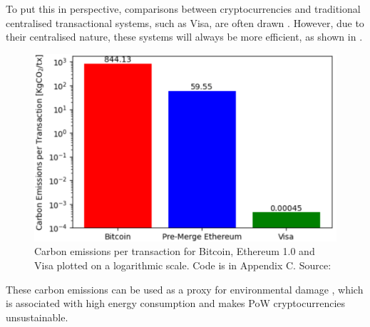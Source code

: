 To put this in perspective, comparisons between cryptocurrencies and traditional centralised transactional systems, such as Visa, are often drawn \cite{Kohli2023AnSolutions}. However, due to their centralised nature, these systems will always be more efficient, as shown in .

\begin{figure}[!htb]
    \centering
    \includegraphics[width=13cm,center]{Figures/CarbonEmissionsPlot.png}
    \caption{Carbon emissions per transaction for Bitcoin, Ethereum 1.0 and Visa plotted on a logarithmic scale. Code is in Appendix C. Source: \cite{Kohli2023AnSolutions} }
    \label{Figure:CarbonEmissionsPlot}
\end{figure}

These carbon emissions can be used as a proxy for environmental damage \cite{2022VisaReport}, which is associated with high energy consumption and makes PoW cryptocurrencies unsustainable.



